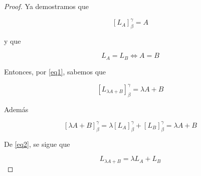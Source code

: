 \documentclass[12pt]{article}
\begin{document}
\begin{proof}
    Ya demostramos que 

    \begin{equation} \label{eq1}
        {[L_A]}_{\beta}^{\gamma} = A
    \end{equation}

    y que 

    \begin{equation} \label{eq2}
        L_A = L_B \iff A = B
    \end{equation}

    Entonces, por \ref{eq1}, sabemos que

    $$ {[L_{\lambda A + B}]}_{\beta}^{\gamma} = \lambda A + B$$

    Además

    $${[\lambda A + B]}_{\beta}^{\gamma} =  \lambda {[L_A]}_{\beta}^{\gamma} +  {[L_B]}_{\beta}^{\gamma} = \lambda A + B$$

    De \ref{eq2}, se sigue que 
    
    $$L_{\lambda A + B} = \lambda L_A + L_B$$
\end{proof}
\end{document}

